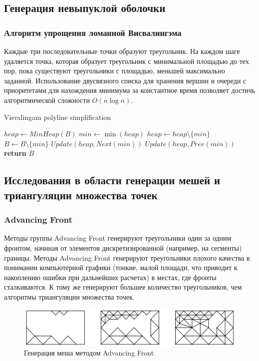\documentclass{fefu}
\newenvironment{algo}[1][]
  {\begin{algorithm}[#1]
     \selectlanguage{english}
     \floatname{algorithm}{Алгоритм}
  }
  {\end{algorithm}}
\begin{document}
\subsection{Генерация невыпуклой оболочки}
\subsubsection{Алгоритм упрощения ломанной Висвалингэма}
Каждые три последовательные точки образуют треугольник. На каждом шаге удаляется точка, которая образует
треугольник с минимальной площадью до тех пор, пока существуют треугольники с площадью, меньшей максимально заданной. 
Использование двусвязного списка для хранения вершин и очереди с приоритетами для нахождения минимума за константное время 
позволяет достичь алгоритмической сложности $O(n\log{}n)$.
\begin{algo}[H]
    \caption{Visvalingam polyline simplification}
    \begin{algorithmic}[1]
         
            \State $heap \gets MinHeap(B)$ 
                \State $min \gets \min\left(heap\right)$
                \State $heap \gets heap \setminus \{min\}$
                    \State $B \gets B \setminus \{min\}$
                    \State $Update(heap, Next(min))$
                    \State $Update(heap, Prev(min))$
                \EndIf
            \EndWhile
            \State \textbf{return} $B$
        \EndProcedure
    \end{algorithmic}
\end{algo}
\subsection{Исследования в области генерации мешей и триангуляции множества точек}
\subsubsection{Advancing Front}
Методы группы Advancing Front\cite{AdvancingFront} генерируют треугольники один за одним фронтом, начиная от элементов 
дискретизированной (например, на сегменты) границы. Методы Advancing Front генерируют треугольники плохого качества 
в понимании компьютерной графики (тонкие, малой площади, что приводит к накоплению ошибки при дальнейших расчетах) 
в местах, где фронты сталкиваются. К тому же генерируют большее количество треугольников, чем алгоритмы триангуляции 
множества точек.
\begin{figure}[H]
    \centering
    \includegraphics[]{images/AdvancingFront.png}
    \caption{Генерация меша методом Advancing Front}
\end{figure}
\end{document}
